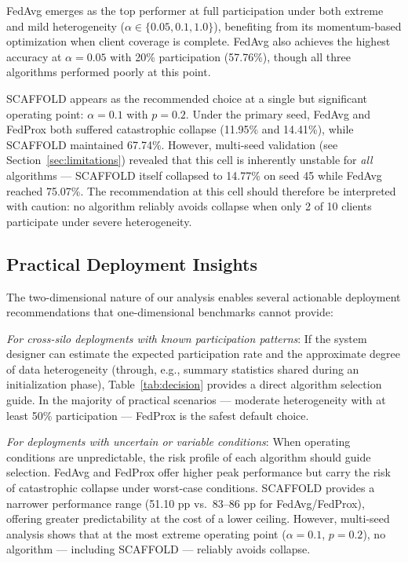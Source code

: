 \documentclass[conference]{IEEEtran}
\begin{document}
FedAvg emerges as the top performer at full participation under both extreme and mild heterogeneity ($\alpha \in \{0.05, 0.1, 1.0\}$), benefiting from its momentum-based optimization when client coverage is complete. FedAvg also achieves the highest accuracy at $\alpha = 0.05$ with 20\% participation (57.76\%), though all three algorithms performed poorly at this point.

SCAFFOLD appears as the recommended choice at a single but significant operating point: $\alpha = 0.1$ with $p = 0.2$. Under the primary seed, FedAvg and FedProx both suffered catastrophic collapse (11.95\% and 14.41\%), while SCAFFOLD maintained 67.74\%. However, multi-seed validation (see Section~\ref{sec:limitations}) revealed that this cell is inherently unstable for \textit{all} algorithms --- SCAFFOLD itself collapsed to 14.77\% on seed 45 while FedAvg reached 75.07\%. The recommendation at this cell should therefore be interpreted with caution: no algorithm reliably avoids collapse when only 2 of 10 clients participate under severe heterogeneity.

\subsection{Practical Deployment Insights}

The two-dimensional nature of our analysis enables several actionable deployment recommendations that one-dimensional benchmarks cannot provide:

\textit{For cross-silo deployments with known participation patterns}: If the system designer can estimate the expected participation rate and the approximate degree of data heterogeneity (through, e.g., summary statistics shared during an initialization phase), Table~\ref{tab:decision} provides a direct algorithm selection guide. In the majority of practical scenarios --- moderate heterogeneity with at least 50\% participation --- FedProx is the safest default choice.

\textit{For deployments with uncertain or variable conditions}: When operating conditions are unpredictable, the risk profile of each algorithm should guide selection. FedAvg and FedProx offer higher peak performance but carry the risk of catastrophic collapse under worst-case conditions. SCAFFOLD provides a narrower performance range (51.10 pp vs.\ 83--86 pp for FedAvg/FedProx), offering greater predictability at the cost of a lower ceiling. However, multi-seed analysis shows that at the most extreme operating point ($\alpha = 0.1$, $p = 0.2$), no algorithm --- including SCAFFOLD --- reliably avoids collapse.
\end{document}
